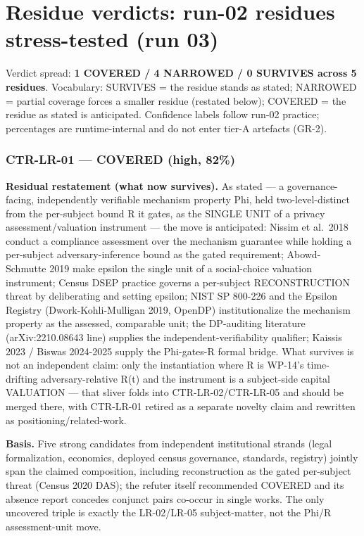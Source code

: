 \documentclass[
  11pt,
]{article}
\begin{document}
\newpage

\section{Residue verdicts: run-02 residues stress-tested (run
03)}\label{residue-verdicts-run-02-residues-stress-tested-run-03}

Verdict spread: \textbf{1 COVERED / 4 NARROWED / 0 SURVIVES across 5
residues}. Vocabulary: SURVIVES = the residue stands as stated; NARROWED
= partial coverage forces a smaller residue (restated below); COVERED =
the residue as stated is anticipated. Confidence labels follow run-02
practice; percentages are runtime-internal and do not enter tier-A
artefacts (GR-2).

\subsubsection{CTR-LR-01 --- COVERED (high,
82\%)}\label{ctr-lr-01-covered-high-82}

\textbf{Residual restatement (what now survives).} As stated --- a
governance-facing, independently verifiable mechanism property Phi, held
two-level-distinct from the per-subject bound R it gates, as the SINGLE
UNIT of a privacy assessment/valuation instrument --- the move is
anticipated: Nissim et al.~2018 conduct a compliance assessment over the
mechanism guarantee while holding a per-subject adversary-inference
bound as the gated requirement; Abowd-Schmutte 2019 make epsilon the
single unit of a social-choice valuation instrument; Census DSEP
practice governs a per-subject RECONSTRUCTION threat by deliberating and
setting epsilon; NIST SP 800-226 and the Epsilon Registry
(Dwork-Kohli-Mulligan 2019, OpenDP) institutionalize the mechanism
property as the assessed, comparable unit; the DP-auditing literature
(arXiv:2210.08643 line) supplies the independent-verifiability
qualifier; Kaissis 2023 / Biswas 2024-2025 supply the Phi-gates-R formal
bridge. What survives is not an independent claim: only the
instantiation where R is WP-14's time-drifting adversary-relative R(t)
and the instrument is a subject-side capital VALUATION --- that sliver
folds into CTR-LR-02/CTR-LR-05 and should be merged there, with
CTR-LR-01 retired as a separate novelty claim and rewritten as
positioning/related-work.

\textbf{Basis.} Five strong candidates from independent institutional
strands (legal formalization, economics, deployed census governance,
standards, registry) jointly span the claimed composition, including
reconstruction as the gated per-subject threat (Census 2020 DAS); the
refuter itself recommended COVERED and its absence report concedes
conjunct pairs co-occur in single works. The only uncovered triple is
exactly the LR-02/LR-05 subject-matter, not the Phi/R assessment-unit
move.
\end{document}
